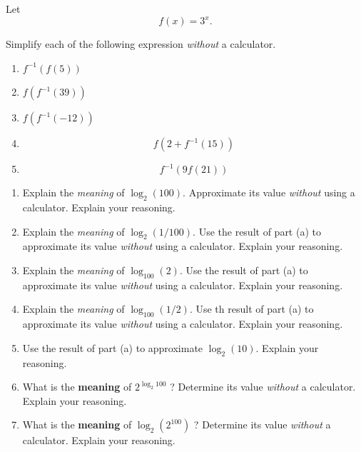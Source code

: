 \documentclass{ximera}
\begin{document}
\begin{question} \label{Qkdf3fzzz}
Let 
\[
    f(x) = 3^x .
\]

Simplify each of the following expression \emph{without} a calculator.

\begin{enumerate}

\item $f^{-1}(f(5))$

\item $f(f^{-1}(39))$

\item $f(f^{-1}(-12))$

\item
\[
        f(2 + f^{-1}(15) )
\]

\item
\[
       f^{-1} ( 9 f(21) ) 
\]
\end{enumerate}

\end{question}


\begin{question}    \label{Ex0:LogFfdf}
\begin{enumerate}
\item Explain the \emph{meaning} of $\log_2(100)$. Approximate its value \emph{without} using a calculator. Explain your reasoning.

\item Explain the \emph{meaning} of $\log_2(1/100)$. Use the result of part (a) to approximate its value \emph{without} using a calculator. Explain your reasoning.

\item Explain the \emph{meaning} of $\log_{100}(2)$. Use the result of part (a) to approximate its value \emph{without} using a calculator. Explain your reasoning.

\item Explain the \emph{meaning} of $\log_{100}(1/2)$. Use th result of part (a) to approximate its value \emph{without} using a calculator. Explain your reasoning.

\item Use the result of part (a) to approximate $\log_2(10)$. Explain your reasoning.

\item What is the {\bf meaning} of $2^{\log_2 100}$ ? Determine its value \emph{without} a calculator. Explain your reasoning.

\item What is the {\bf meaning} of $\log_2 (2^{100})$ ? Determine its value \emph{without} a calculator. Explain your reasoning.

\end{enumerate}

\end{question}
\end{document}

